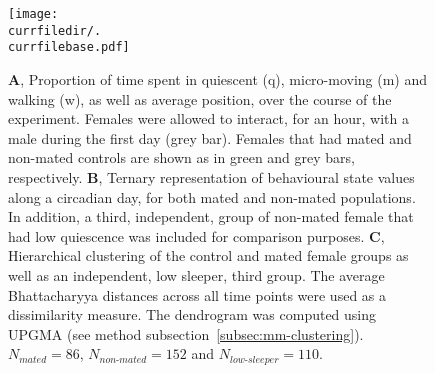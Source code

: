 \begin{figure}[h!]
	\centering   
	\texttt{[image: \\currfiledir/.\\currfilebase.pdf]}
	  \caption[Effect of mating on female behaviour]{
	\textbf{A}, Proportion of time spent in quiescent (q), micro-moving (m) and walking (w), as well as average position, over the course of the experiment. Females were allowed to interact, for an hour, with a male during the first day (grey bar). Females that had mated and non-mated controls are shown as in green and grey bars, respectively.
	\textbf{B}, Ternary representation of behavioural state values along a circadian day, for  both mated and non-mated populations. In addition, a third, independent, group of non-mated female that had low quiescence was included for comparison purposes.
	\textbf{C}, Hierarchical clustering of the control and mated female groups as well as an independent, low sleeper, third group.
	The average Bhattacharyya distances across all time points were used as a dissimilarity measure.
	The dendrogram was computed using UPGMA (see method subsection~\ref{subsec:mm-clustering}).
	$N_{mated} = 86$, $N_{non\text{-}mated} = 152$ and 	$N_{low\text{-}sleeper} = 110$.
	\label{fig:\currfilebase}
}
\end{figure}
